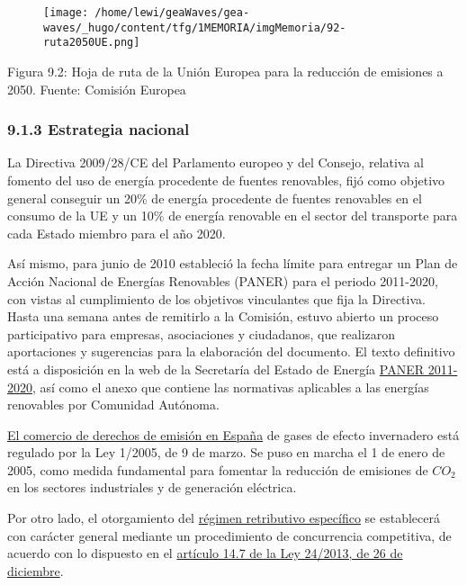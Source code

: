 \begin{figure}
\centering
\texttt{[image: /home/lewi/geaWaves/gea-waves/\_hugo/content/tfg/1MEMORIA/imgMemoria/92-ruta2050UE.png]}
\caption{}
\end{figure}

Figura 9.2: Hoja de ruta de la Unión Europea para la reducción de
emisiones a 2050. Fuente: Comisión Europea

\subsubsection{9.1.3 Estrategia nacional}\label{header-n130}

La Directiva 2009/28/CE del Parlamento europeo y del Consejo, relativa
al fomento del uso de energía procedente de fuentes renovables, fijó
como objetivo general conseguir un 20\% de energía procedente de fuentes
renovables en el consumo de la UE y un 10\% de energía renovable en el
sector del transporte para cada Estado miembro para el año 2020.

Así mismo, para junio de 2010 estableció la fecha límite para entregar
un Plan de Acción Nacional de Energías Renovables (PANER) para el
periodo 2011-2020, con vistas al cumplimiento de los objetivos
vinculantes que fija la Directiva. Hasta una semana antes de remitirlo a
la Comisión, estuvo abierto un proceso participativo para empresas,
asociaciones y ciudadanos, que realizaron aportaciones y sugerencias
para la elaboración del documento. El texto definitivo está a
disposición en la web de la Secretaría del Estado de Energía
\href{http://www.minetad.gob.es/energia/desarrollo/EnergiaRenovable/Paginas/paner.aspx}{PANER
2011-2020}, así como el anexo que contiene las normativas aplicables a
las energías renovables por Comunidad Autónoma.

\href{http://www.mapama.gob.es/es/cambio-climatico/temas/comercio-de-derechos-de-emision/el-comercio-de-derechos-de-emision-en-espana/}{El
comercio de derechos de emisión en España} de gases de efecto
invernadero está regulado por la Ley 1/2005, de 9 de marzo. Se puso en
marcha el 1 de enero de 2005, como medida fundamental para fomentar la
reducción de emisiones de \(CO_2\) en los sectores industriales y de
generación eléctrica.

Por otro lado, el otorgamiento del
\href{http://www.minetad.gob.es/energia/electricidad/energias-renovables/Paginas/renovables.aspx}{régimen
retributivo específico} se establecerá con carácter general mediante un
procedimiento de concurrencia competitiva, de acuerdo con lo dispuesto
en el
\href{http://www.boe.es/buscar/act.php?id=BOE-A-2013-13645\&tn=1\&p=20140328\&vd=\#a14}{artículo
14.7 de la Ley 24/2013, de 26 de diciembre}.

